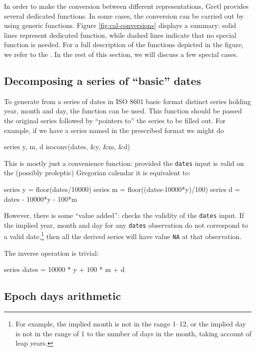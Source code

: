 In order to make the conversion between different representations,
Gretl provides several dedicated functions. In some cases, the
conversion can be carried out by using generic functions. Figure
\ref{fig:cal-conversions} displays a summary: solid lines represent
dedicated function, while dashed lines indicate that no special
function is needed. For a full description of the functions depicted
in the figure, we refer to the \GCR. In the rest of this section, we
will discuss a few special cases.

\subsection{Decomposing a series of ``basic'' dates}

To generate from a series of dates in ISO 8601 basic format distinct
series holding year, month and day, the function  can
be used. This function should be passed the original series followed
by ``pointers to'' the series to be filled out. For example, if we
have a series named  in the prescribed format we might
do
%
\begin{code}
series y, m, d
isoconv(dates, &y, &m, &d)
\end{code}

This is mostly just a convenience function: provided the
\texttt{dates} input is valid on the (possibly proleptic) Gregorian
calendar it is equivalent to:
%
\begin{code}
series y = floor(dates/10000)
series m = floor((dates-10000*y)/100)
series d = dates - 10000*y - 100*m
\end{code}

However, there is some ``value added'':  checks the
validity of the \texttt{dates} input. If the implied year, month and
day for any \texttt{dates} observation do not correspond to a valid
date,\footnote{For example, the implied month is not in the range
  1--12, or the implied day is not in the range of 1 to the number of
  days in the month, taking account of leap years.} then all the
derived series will have value \texttt{NA} at that observation.

The inverse operation is trivial:
\begin{code}
series dates = 10000 * y + 100 * m + d
\end{code}

\subsection{Epoch days arithmetic}

